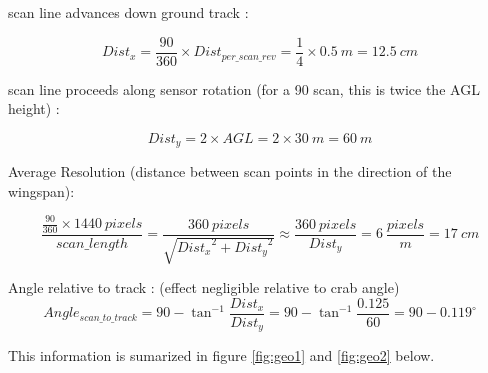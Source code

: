 \documentclass[a4paper,11pt]{report}
\begin{document}
scan line advances down ground track :

\begin{equation} 
Dist_{x}=  \frac{90}{360} \times Dist_{per\_scan\_rev} = \frac{1}{4} \times 0.5~m = 12.5~cm
\end{equation}

scan line proceeds along sensor rotation (for a 90 scan, this is twice the AGL height) :

\begin{equation} 
Dist_{y}=  2 \times AGL = 2 \times 30~m = 60~m
\end{equation}

Average Resolution (distance between scan points in the direction of the wingspan):

\begin{equation}  
\frac{ \frac{90}{360} \times 1440~pixels }{scan\_length} = 
\frac{360~pixels}{\sqrt{{Dist_x}^2+{Dist_y}^2}} \approx \frac{360~pixels}{Dist_y}= 6~ \frac{pixels}{m} = 17~cm
\end{equation}

Angle relative to track : (effect negligible relative to crab angle)
\begin{equation} Angle_{scan\_to\_track} = 90 - \tan^{-1} \frac{Dist_x}{Dist_y} = 90 - \tan^{-1} \frac{0.125}{60} = 90 - 0.119^\circ
\end{equation}

This information is sumarized in figure \ref{fig:geo1} and \ref{fig:geo2} below.
\end{document}
